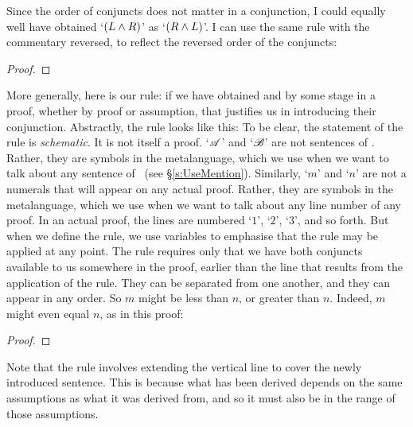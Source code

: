 Since the order of conjuncts does not matter in a conjunction, I could equally well have obtained `$(L \wedge R)$' as `$(R \wedge L)$'. I can use the same rule with the commentary reversed, to reflect the reversed order of the conjuncts:
\begin{proof}
	 
\end{proof}
 More generally, here is our  rule: if we have obtained  and  by some stage in a proof, whether by proof or assumption, that justifies us in introducing their conjunction. Abstractly, the rule looks like this:
To be clear, the statement of the rule is \emph{schematic}. It is not itself a proof. `$\mathscr{A}$' and `$\mathscr{B}$' are not sentences of \TFL. Rather, they are symbols in the metalanguage, which we use when we want to talk about any sentence of \TFL\ (see §\ref{s:UseMention}). Similarly, `$m$' and `$n$' are not a numerals that will appear on any actual proof. Rather, they are symbols in the metalanguage, which we use when we want to talk about any line number of any proof. In an actual proof, the lines are numbered `$1$', `$2$', `$3$', and so forth. But when we define the rule, we use variables to emphasise that the rule may be applied at any point. The rule requires only that we have both conjuncts available to us somewhere in the proof, earlier than the line that results from the application of the rule. They can be separated from one another, and they can appear in any order. So $m$ might be less than $n$, or greater than $n$. Indeed, $m$ might even equal $n$, as in this proof:
\begin{proof}
	 
\end{proof}

Note that the rule involves extending the vertical line to cover the newly introduced sentence. This is because what has been derived depends on the same assumptions as what it was derived from, and so it must also be in the range of those assumptions.  

